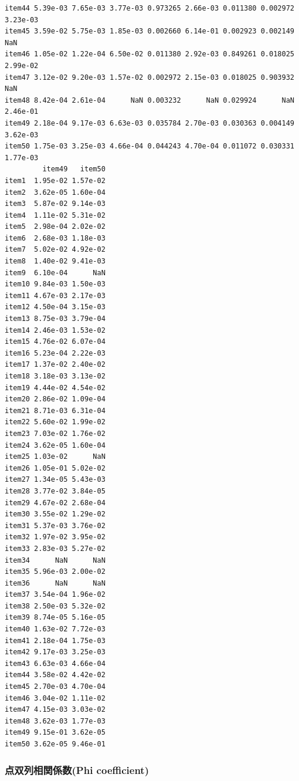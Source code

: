 \documentclass[
  a4paper,
]{ltjsbook}
\newenvironment{Shaded}{\begin{snugshade}}{\end{snugshade}}
\newcommand{\NormalTok}[1]{\textcolor[rgb]{0.00,0.23,0.31}{#1}}
\newcommand{\SpecialCharTok}[1]{\textcolor[rgb]{0.37,0.37,0.37}{#1}}
\begin{document}
\begin{verbatim}
item44 5.39e-03 7.65e-03 3.77e-03 0.973265 2.66e-03 0.011380 0.002972 3.23e-03
item45 3.59e-02 5.75e-03 1.85e-03 0.002660 6.14e-01 0.002923 0.002149      NaN
item46 1.05e-02 1.22e-04 6.50e-02 0.011380 2.92e-03 0.849261 0.018025 2.99e-02
item47 3.12e-02 9.20e-03 1.57e-02 0.002972 2.15e-03 0.018025 0.903932      NaN
item48 8.42e-04 2.61e-04      NaN 0.003232      NaN 0.029924      NaN 2.46e-01
item49 2.18e-04 9.17e-03 6.63e-03 0.035784 2.70e-03 0.030363 0.004149 3.62e-03
item50 1.75e-03 3.25e-03 4.66e-04 0.044243 4.70e-04 0.011072 0.030331 1.77e-03
         item49   item50
item1  1.95e-02 1.57e-02
item2  3.62e-05 1.60e-04
item3  5.87e-02 9.14e-03
item4  1.11e-02 5.31e-02
item5  2.98e-04 2.02e-02
item6  2.68e-03 1.18e-03
item7  5.02e-02 4.92e-02
item8  1.40e-02 9.41e-03
item9  6.10e-04      NaN
item10 9.84e-03 1.50e-03
item11 4.67e-03 2.17e-03
item12 4.50e-04 3.15e-03
item13 8.75e-03 3.79e-04
item14 2.46e-03 1.53e-02
item15 4.76e-02 6.07e-04
item16 5.23e-04 2.22e-03
item17 1.37e-02 2.40e-02
item18 3.18e-03 3.13e-02
item19 4.44e-02 4.54e-02
item20 2.86e-02 1.09e-04
item21 8.71e-03 6.31e-04
item22 5.60e-02 1.99e-02
item23 7.03e-02 1.76e-02
item24 3.62e-05 1.60e-04
item25 1.03e-02      NaN
item26 1.05e-01 5.02e-02
item27 1.34e-05 5.43e-03
item28 3.77e-02 3.84e-05
item29 4.67e-02 2.68e-04
item30 3.55e-02 1.29e-02
item31 5.37e-03 3.76e-02
item32 1.97e-02 3.95e-02
item33 2.83e-03 5.27e-02
item34      NaN      NaN
item35 5.96e-03 2.00e-02
item36      NaN      NaN
item37 3.54e-04 1.96e-02
item38 2.50e-03 5.32e-02
item39 8.74e-05 5.16e-05
item40 1.63e-02 7.72e-03
item41 2.18e-04 1.75e-03
item42 9.17e-03 3.25e-03
item43 6.63e-03 4.66e-04
item44 3.58e-02 4.42e-02
item45 2.70e-03 4.70e-04
item46 3.04e-02 1.11e-02
item47 4.15e-03 3.03e-02
item48 3.62e-03 1.77e-03
item49 9.15e-01 3.62e-05
item50 3.62e-05 9.46e-01
\end{verbatim}

\subsubsection{点双列相関係数(Phi
coefficient)}\label{ux70b9ux53ccux5217ux76f8ux95a2ux4fc2ux6570phi-coefficient}

\begin{Shaded}
\end{Shaded}
\end{document}
